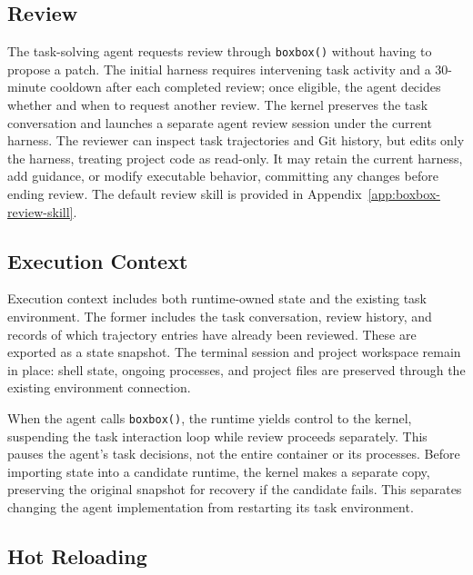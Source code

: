 \subsection{Review}
\label{app:boxbox-agent-initiated}

The task-solving agent requests review through \texttt{boxbox()} without
having to propose a patch. The initial harness requires intervening task
activity and a 30-minute cooldown after each completed review; once eligible,
the agent decides whether and when to request another review.
The kernel preserves the task conversation and launches a separate agent
review session under the current harness. The reviewer can inspect task
trajectories and Git history, but edits only the harness, treating project
code as read-only. It may retain the current harness, add guidance, or modify
executable behavior, committing any changes before ending review.
The default review skill is provided in Appendix~\ref{app:boxbox-review-skill}.

\subsection{Execution Context}
\label{app:boxbox-execution-context}

Execution context includes both runtime-owned state and the existing task
environment. The former includes the task conversation, review history, and
records of which trajectory entries have already been reviewed. These are
exported as a state snapshot. The terminal session and project workspace
remain in place: shell state, ongoing processes, and project files are
preserved through the existing environment connection.

When the agent calls \texttt{boxbox()}, the runtime yields control to the
kernel, suspending the task interaction loop while review proceeds separately.
This pauses the agent's task decisions, not the entire container or its
processes. Before importing state into a candidate runtime, the kernel makes
a separate copy, preserving the original snapshot for recovery if the
candidate fails. This separates changing the agent implementation from
restarting its task environment.

\subsection{Hot Reloading}
\label{app:boxbox-transition}

